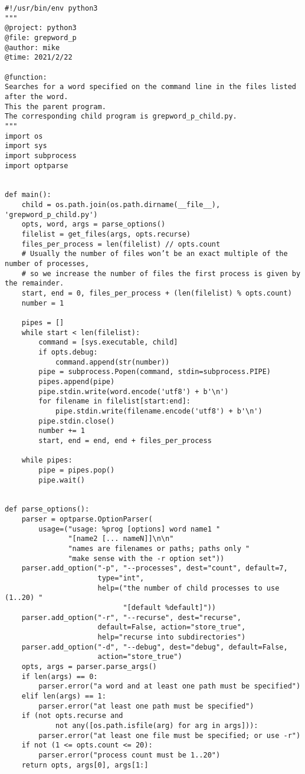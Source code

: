 \begin{lstlisting}
#!/usr/bin/env python3
"""
@project: python3
@file: grepword_p
@author: mike
@time: 2021/2/22

@function:
Searches for a word specified on the command line in the files listed after the word.
This the parent program. 
The corresponding child program is grepword_p_child.py.
"""
import os
import sys
import subprocess
import optparse


def main():
    child = os.path.join(os.path.dirname(__file__), 'grepword_p_child.py')
    opts, word, args = parse_options()
    filelist = get_files(args, opts.recurse)
    files_per_process = len(filelist) // opts.count
    # Usually the number of files won’t be an exact multiple of the number of processes,
    # so we increase the number of files the first process is given by the remainder.
    start, end = 0, files_per_process + (len(filelist) % opts.count)
    number = 1

    pipes = []
    while start < len(filelist):
        command = [sys.executable, child]
        if opts.debug:
            command.append(str(number))
        pipe = subprocess.Popen(command, stdin=subprocess.PIPE)
        pipes.append(pipe)
        pipe.stdin.write(word.encode('utf8') + b'\n')
        for filename in filelist[start:end]:
            pipe.stdin.write(filename.encode('utf8') + b'\n')
        pipe.stdin.close()
        number += 1
        start, end = end, end + files_per_process

    while pipes:
        pipe = pipes.pop()
        pipe.wait()


def parse_options():
    parser = optparse.OptionParser(
        usage=("usage: %prog [options] word name1 "
               "[name2 [... nameN]]\n\n"
               "names are filenames or paths; paths only "
               "make sense with the -r option set"))
    parser.add_option("-p", "--processes", dest="count", default=7,
                      type="int",
                      help=("the number of child processes to use (1..20) "
                            "[default %default]"))
    parser.add_option("-r", "--recurse", dest="recurse",
                      default=False, action="store_true",
                      help="recurse into subdirectories")
    parser.add_option("-d", "--debug", dest="debug", default=False,
                      action="store_true")
    opts, args = parser.parse_args()
    if len(args) == 0:
        parser.error("a word and at least one path must be specified")
    elif len(args) == 1:
        parser.error("at least one path must be specified")
    if (not opts.recurse and
            not any([os.path.isfile(arg) for arg in args])):
        parser.error("at least one file must be specified; or use -r")
    if not (1 <= opts.count <= 20):
        parser.error("process count must be 1..20")
    return opts, args[0], args[1:]



\end{lstlisting}
